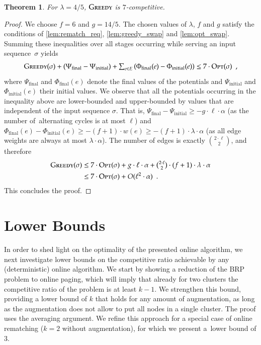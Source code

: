 \documentclass[11pt,a4paper]{scrartcl}
\newtheorem{theorem}{Theorem}
\newcommand{\GREEDY}{\textsc{Greedy}\xspace}
\newcommand{\OPT}{\textsc{Opt}\xspace}
\begin{document}
\begin{theorem}
\label{thm:rematching}
For $\lambda = 4/5$, $\GREEDY$ is $7$-competitive.
\end{theorem}

\begin{proof}
We choose $f = 6$ and $g = 14/5$. The chosen values of $\lambda$, $f$ and $g$
satisfy the conditions of \cref{lem:rematch_req},
\cref{lem:greedy_swap} and \cref{lem:opt_swap}. Summing these
inequalities over all stages occurring while serving an input sequence~$\sigma$
yields
\begin{equation*}
	\textstyle \GREEDY(\sigma) + (\Psi_\textrm{final} - \Psi_\textrm{initial})
	+ \sum_{e \in E} \left( 
		\Phi_\textrm{final}(e) - \Phi_\textrm{initial}(e) \right)
	\leq 7 \cdot \OPT(\sigma) \enspace,
\end{equation*}
where $\Psi_\textrm{final}$ and $\Phi_\textrm{final}(e)$ denote the final
values of the potentials and $\Psi_\textrm{initial}$ and
$\Phi_\textrm{initial}(e)$ their initial values. We observe that all the
potentials occurring in the inequality above are lower-bounded and
upper-bounded by values that are independent of the input sequence $\sigma$.
That is, $\Psi_\textrm{final} - \Psi_\textrm{initial} \geq - g \cdot \ell
\cdot \alpha$ (as the number of~alternating cycles is at most $\ell$) and
$\Phi_\textrm{final}(e) - \Phi_\textrm{initial}(e) \geq - (f+1) \cdot w(e)
\geq - (f+1) \cdot \lambda \cdot \alpha$ (as all edge weights are always 
at most $\lambda \cdot \alpha$). The number of edges is exactly $\binom{2
\cdot \ell}{2}$, and therefore
\begin{align*}
	 \GREEDY(\sigma) 
	\leq &\; 7 \cdot \OPT(\sigma) 
	+ \textstyle g \cdot \ell \cdot \alpha + \binom{2 \cdot \ell}{2} \cdot (f+1) \cdot 
	\lambda \cdot \alpha \\
	\leq &\; 7 \cdot \OPT(\sigma) 
	+ O(\ell^2 \cdot \alpha)
	\enspace.
\end{align*}
This concludes the proof.
\end{proof}



\section{Lower Bounds}
\label{sec:lower}

In order to shed light on the optimality of the presented online algorithm, we
next investigate lower bounds on the competitive ratio achievable by any
(deterministic) online algorithm. We start by showing a reduction of the BRP
problem to online paging, which will imply that already for two clusters the
competitive ratio of the problem is at least $k-1$. We strengthen this bound,
providing a lower bound of $k$ that holds for any amount of augmentation, as
long as the augmentation does not allow to put all nodes in a single 
cluster. The proof uses the averaging argument. We refine this approach for a
special case of online rematching ($k = 2$ without augmentation), for which we
present a~lower bound of $3$.
\end{document}
